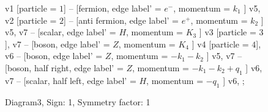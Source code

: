 \documentclass{revtex4}
\begin{document}
\begin{figure}[!htb]
\begin{center}
{    %
v1 [particle = \(1\)] -- [fermion, edge label' = \(e^{-}\), momentum = \(k_{1}\) ] v5, 
v2 [particle = \(2\)] -- [anti fermion, edge label' = \(e^{+}\), momentum = \(k_{2}\) ] v5, 
v7 -- [scalar, edge label' = \(H\), momentum = \(K_{3}\) ] v3 [particle = \(3\)], 
v7 -- [boson, edge label' = \(Z\), momentum = \(K_{4}\) ] v4 [particle = \(4\)], 
v6 -- [boson, edge label' = \(Z\), momentum = \(-k_{1} - k_{2}\) ] v5, 
v7 -- [boson, half right, edge label' = \(Z\), momentum = \(-k_{1} - k_{2} + q_{1}\) ] v6, 
v7 -- [scalar, half left, edge label' = \(H\), momentum = \(-q_{1}\) ] v6, 
};
\end{center}
\caption{Diagram3, Sign: 1, Symmetry factor: 1}
\end{figure}
\newpage
\end{document}
